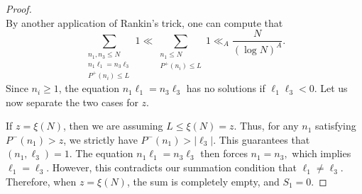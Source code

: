 \documentclass[12pt]{amsart}
\renewcommand{\le}{\leqslant}
\renewcommand{\leq}{\leqslant}
\renewcommand{\geq}{\geqslant}
\numberwithin{equation}{section}
\theoremstyle{plain}
\theoremstyle{definition}
\renewcommand{\l}{\ell}
\begin{document}
\begin{proof}
\begin{equation}
		\end{equation}
		By another application of Rankin's trick, one can compute that 
		\begin{equation}\label{eq: proof lem 4.3 1}
			\sum_{\substack{n_1,n_3 \le N \\ n_1\l_1=n_3\l_3  \\ P^+(n_i) \leq L }} 1 \ll \sum_{\substack{n_1\leq N \\ P^+(n_i) \leq L }} 1 \ll_A \frac{N}{(\log N)^A}.
		\end{equation}
		Since $n_i \geq 1$, the equation $n_1\l_1=n_3\l_3$ has no solutions if $\l_1\l_3 < 0$. Let us now separate the two cases for $z$. 
		
		If $z = \xi(N)$, then we are assuming $L \leq \xi(N) = z$. Thus, for any $n_1$ satisfying $P^-(n_1) > z$, we strictly have $P^-(n_1) > |\l_3|$. This guarantees that $(n_1,\l_3) = 1$. The equation $n_1\l_1=n_3\l_3$ then forces $n_1 = n_3,$ which implies $\l_1 = \l_3$. However, this contradicts our summation condition that $\l_1 \ne \l_3$. Therefore, when $z = \xi(N)$, the sum is completely empty, and $S_1 = 0$.
		

\end{proof}
\end{document}
